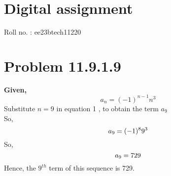 \documentclass[12pt]{article}
\begin{document}
\section*{Digital assignment}
Roll no. : ee23btech11220


\section{\textbf{Problem 11.9.1.9}}

\textbf{Given,} 
\begin{equation}   a_{n}=(-1)^{n-1}n^{3} \end{equation}
Substitute $n=9$ in equation 1 , to obtain the term $a_{9}$ \\
So, \begin{equation}
    a_{9}=(-1)^{8}9^{3}\notag
\end{equation}
So, \begin{equation}
    a_{9}=729\notag
\end{equation}
Hence, the $9^{th}$ term of this sequence is 729.
\end{document}

